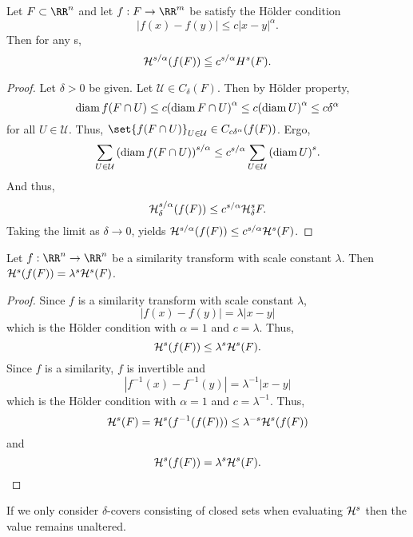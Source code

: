 \begin{thm}\label{hm-holder}
	Let $F\subset\RR^n$ and let $f: F\rightarrow\RR^m$ be satisfy the H\"older condition
	\[
		|f(x)-f(y)| \leq c|x-y|^\alpha.
	\]
	Then for any s,
	\[
		\mathcal{H}^{s/\alpha}(f(F))\leqq c^{s/\alpha}H^s(F).
	\]
\end{thm}
\begin{proof}
	Let $\delta>0$ be given.
	Let $\mathcal{U}\in C_\delta(F)$.
	Then by H\"older property,
	\[
		\operatorname{diam} f(F\cap U)\leq c{(\operatorname{diam} F\cap U)}^\alpha \leq c{(\operatorname{diam} U)}^\alpha\leq c\delta^\alpha
	\]
	for all $U\in\mathcal{U}$.
	Thus, $\set{f(F\cap U)}_{U\in\mathcal U}\in C_{c\delta^\alpha}(f(F))$.
	Ergo,
	\[
		\sum_{U\in\mathcal{U}} {(\operatorname{diam} f(F\cap U))}^{s/\alpha}\leq c^{s/\alpha}\sum_{U\in\mathcal{U}}{(\operatorname{diam} U)}^s.
	\]
	And thus,
	\[
		\mathcal{H}^{s/\alpha}_\delta (f(F)) \leq c^{s/\alpha}\mathcal{H}^s_\delta F.
	\]
	Taking the limit as $\delta\rightarrow 0$, yields $\mathcal{H}^{s/\alpha}(f(F))\leq c^{s/\alpha}\mathcal{H}^s(F)$.
\end{proof}

\begin{thm}\label{hm-sim}
	Let $f:\RR^n\rightarrow\RR^n$ be a similarity transform with scale constant $\lambda$.
	Then $\mathcal{H}^s(f(F))=\lambda^s\mathcal{H}^s(F)$.
\end{thm}
\begin{proof}
	Since $f$ is a similarity transform with scale constant $\lambda$,
	\[
		|f(x)-f(y)|=\lambda|x-y|
	\]
	which is the H\"older condition with $\alpha=1$ and $c=\lambda$.
	Thus,
	\[
		\mathcal{H}^s(f(F))\leq \lambda^s\mathcal{H}^s(F).
	\]
	Since $f$ is a similarity, $f$ is invertible and
	\[
		|f^{-1}(x)-f^{-1}(y)|=\lambda^{-1}|x-y|
	\]
	which is the H\"older condition with $\alpha=1$ and $c=\lambda^{-1}$.
	Thus,
	\[
		\mathcal{H}^s(F)=\mathcal{H}^s(f^{-1}(f(F)))\leq\lambda^{-s}\mathcal{H}^s(f(F))
	\]
	and
	\[
		\mathcal{H}^s(f(F))=\lambda^s\mathcal{H}^s(F).
	\]
\end{proof}

\begin{proposition}
	If we only consider $\delta$-covers consisting of closed sets when evaluating $\mathcal{H}^s$ then the value remains unaltered.
\end{proposition}

